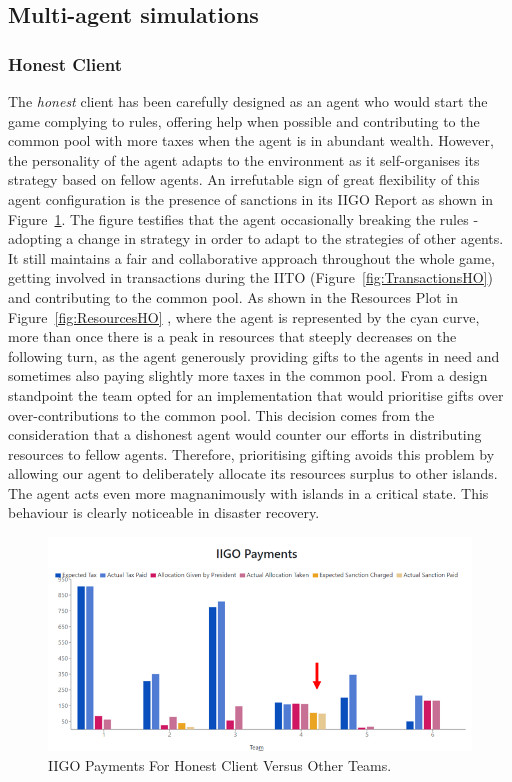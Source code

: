 \subsection{Multi-agent simulations} \label{againstothers}
\subsubsection{Honest Client} \label{honestAO}
The \emph{honest} client has been carefully designed as an agent who would start the game complying to rules, offering help when possible and contributing to the common pool with more taxes when the agent is in abundant wealth. However, the personality of the agent adapts to the environment as it self-organises its strategy based on fellow agents. An irrefutable sign of great flexibility of this agent configuration is the presence of sanctions in its IIGO Report as shown in Figure~\ref{fig:IIGOHO}.
The figure testifies that the agent occasionally breaking the rules - adopting a change in strategy in order to adapt to the strategies of other agents. It still maintains a fair and collaborative approach throughout the whole game, getting involved in transactions during the IITO (Figure~\ref{fig:TransactionsHO}) and contributing to the common pool. As shown in the Resources Plot in Figure~\ref{fig:ResourcesHO} , where the agent is represented by the cyan curve, more than once there is a peak in resources that steeply decreases on the following turn, as the agent generously providing gifts to the agents in need and sometimes also paying slightly more taxes in the common pool. From a design standpoint the team opted for an implementation that would prioritise gifts over over-contributions to the common pool. This decision comes from the consideration that a dishonest agent would counter our efforts in distributing resources to fellow agents. Therefore, prioritising gifting avoids this problem by allowing our agent to deliberately allocate its resources surplus to other islands. The agent acts even more magnanimously with islands in a critical state. This behaviour is clearly noticeable in disaster recovery.
\begin{figure}[H]
\centering
\includegraphics[scale=0.6]{12_team4_agentdesign/images/IIGOHO.PNG}
\caption{IIGO Payments For Honest Client Versus Other Teams.}
\label{fig:IIGOHO}
\end{figure}

